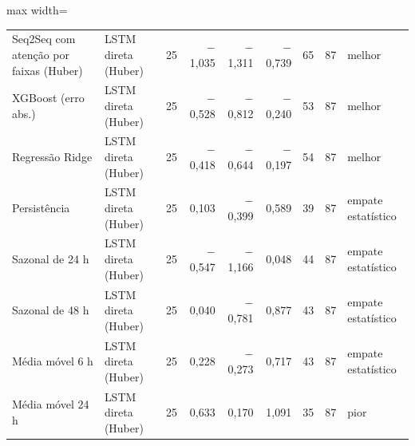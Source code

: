 \begin{table}[!htbp]
\begin{adjustbox}{max width=\textwidth}
\begin{tabular}{llrrrrrrl}
        Seq2Seq com atenção por faixas (Huber) & LSTM direta (Huber) & 25 & $-$1,035 & $-$1,311 & $-$0,739 & 65 & 87 & melhor \\
        XGBoost (erro abs.) & LSTM direta (Huber) & 25 & $-$0,528 & $-$0,812 & $-$0,240 & 53 & 87 & melhor \\
        Regressão Ridge & LSTM direta (Huber) & 25 & $-$0,418 & $-$0,644 & $-$0,197 & 54 & 87 & melhor \\
        Persistência & LSTM direta (Huber) & 25 & 0,103 & $-$0,399 & 0,589 & 39 & 87 & empate estatístico \\
        Sazonal de 24 h & LSTM direta (Huber) & 25 & $-$0,547 & $-$1,166 & 0,048 & 44 & 87 & empate estatístico \\
        Sazonal de 48 h & LSTM direta (Huber) & 25 & 0,040 & $-$0,781 & 0,877 & 43 & 87 & empate estatístico \\
        Média móvel 6 h & LSTM direta (Huber) & 25 & 0,228 & $-$0,273 & 0,717 & 43 & 87 & empate estatístico \\
        Média móvel 24 h & LSTM direta (Huber) & 25 & 0,633 & 0,170 & 1,091 & 35 & 87 & pior \\
        \bottomrule
    \end{tabular}
    \end{adjustbox}
\end{table}
